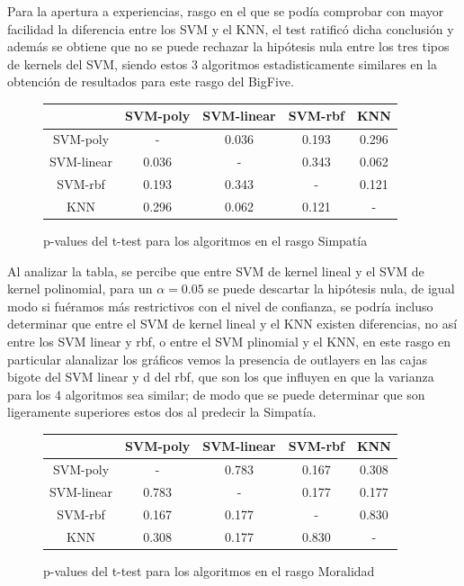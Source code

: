 \documentclass[10pt, a4paper]{article}
\begin{document}
    Para la apertura a experiencias, rasgo en el que se pod\'ia comprobar con mayor facilidad la diferencia entre los SVM y el KNN, el test 
    ratific\'o dicha conclusi\'on y adem\'as se obtiene que no se puede rechazar la hip\'otesis nula entre los tres tipos de kernels del SVM, 
    siendo estos 3 algoritmos estadisticamente similares en la obtenci\'on de resultados para este rasgo del BigFive.

    \begin{figure}[H]
        \centering
        \begin{tabular}{|c|c|c|c|c|}
            \cline{2-5} \multicolumn{1}{c|}{ }& SVM-poly& SVM-linear & SVM-rbf & KNN \\ 
            \hline SVM-poly & - & 0.036 &   0.193 & 0.296 \\ 
            \hline SVM-linear & 0.036 & - & 0.343 & 0.062 \\ 
            \hline SVM-rbf & 0.193 & 0.343 & - & 0.121 \\ 
            \hline KNN & 0.296 & 0.062 & 0.121 & - \\ 
            \hline
        \end{tabular}
        \caption{p-values del t-test para los algoritmos en el rasgo Simpat\'ia}
    \end{figure}

    Al analizar la tabla, se percibe que entre SVM de kernel lineal y el SVM de kernel polinomial, para 
    un $\alpha = 0.05$ se puede descartar la hip\'otesis nula, de igual modo si fu\'eramos m\'as restrictivos con el nivel de confianza, 
    se podr\'ia incluso determinar que entre el SVM de kernel lineal y el KNN existen diferencias, no as\'i entre los SVM linear y rbf, o entre 
    el SVM plinomial y el KNN, en este rasgo en particular alanalizar los gr\'aficos vemos la presencia de outlayers en las cajas bigote del SVM linear y d
    del rbf, que son los que influyen en que la varianza para los $4$ algoritmos sea similar; de modo que 
    se puede determinar que son ligeramente superiores estos dos al predecir la Simpat\'ia.

    \begin{figure}[H]
        \centering
        \begin{tabular}{|c|c|c|c|c|}
            \cline{2-5} \multicolumn{1}{c|}{ }& SVM-poly& SVM-linear & SVM-rbf & KNN \\ 
            \hline SVM-poly & - & 0.783 &   0.167 & 0.308 \\ 
            \hline SVM-linear & 0.783 & - &0.177 & 0.177 \\ 
            \hline SVM-rbf & 0.167 & 0.177 & - & 0.830 \\ 
            \hline KNN & 0.308 & 0.177 & 0.830 & - \\ 
            \hline
        \end{tabular}
        \caption{p-values del t-test para los algoritmos en el rasgo Moralidad}
    \end{figure}
\end{document}
